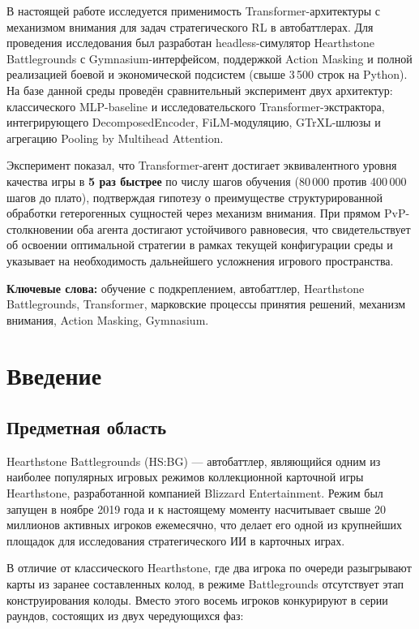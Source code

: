 \documentclass[a4paper,12pt]{extarticle}
\begin{document}
В настоящей работе исследуется применимость Transformer-архитектуры с механизмом внимания для задач стратегического RL в автобаттлерах. Для проведения исследования был разработан headless-симулятор Hearthstone Battlegrounds с Gymnasium-интерфейсом, поддержкой Action Masking и полной реализацией боевой и экономической подсистем (свыше 3\,500 строк на Python). На базе данной среды проведён сравнительный эксперимент двух архитектур: классического MLP-baseline и исследовательского Transformer-экстрактора, интегрирующего DecomposedEncoder, FiLM-модуляцию, GTrXL-шлюзы и агрегацию Pooling by Multihead Attention.

Эксперимент показал, что Transformer-агент достигает эквивалентного уровня качества игры в \textbf{5 раз быстрее} по числу шагов обучения (80\,000 против 400\,000 шагов до плато), подтверждая гипотезу о преимуществе структурированной обработки гетерогенных сущностей через механизм внимания. При прямом PvP-столкновении оба агента достигают устойчивого равновесия, что свидетельствует об освоении оптимальной стратегии в рамках текущей конфигурации среды и указывает на необходимость дальнейшего усложнения игрового пространства.


\textbf{Ключевые слова:} обучение с подкреплением, автобаттлер, Hearthstone Battlegrounds, Transformer, марковские процессы принятия решений, механизм внимания, Action Masking, Gymnasium.

\newpage

\section{Введение}

\subsection{Предметная область}

Hearthstone Battlegrounds (HS:BG) --- автобаттлер, являющийся одним из наиболее популярных игровых режимов коллекционной карточной игры Hearthstone, разработанной компанией Blizzard Entertainment. Режим был запущен в ноябре 2019 года и к настоящему моменту насчитывает свыше 20 миллионов активных игроков ежемесячно, что делает его одной из крупнейших площадок для исследования стратегического ИИ в карточных играх.

В отличие от классического Hearthstone, где два игрока по очереди разыгрывают карты из заранее составленных колод, в режиме Battlegrounds отсутствует этап конструирования колоды. Вместо этого восемь игроков конкурируют в серии раундов, состоящих из двух чередующихся фаз:
\end{document}
